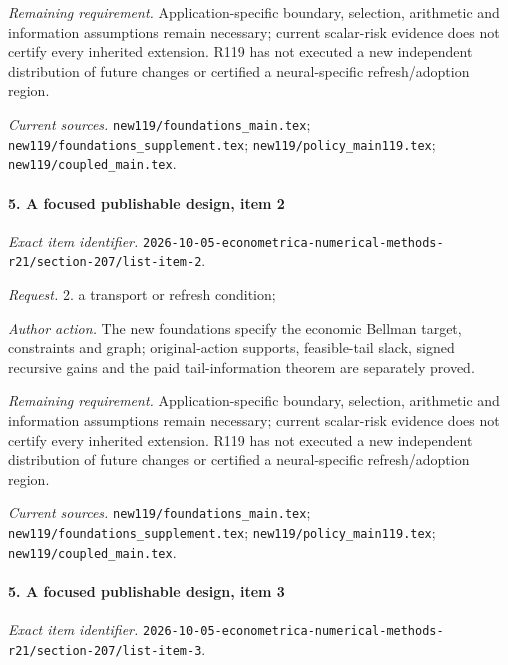 \par\emph{Remaining requirement.} Application-specific boundary, selection, arithmetic and information assumptions remain necessary; current scalar-risk evidence does not certify every inherited extension. R119 has not executed a new independent distribution of future changes or certified a neural-specific refresh/\allowbreak{}adoption region.

\par\emph{Current sources.} \nolinkurl{new119/foundations_main.tex}; \nolinkurl{new119/foundations_supplement.tex}; \nolinkurl{new119/policy_main119.tex}; \nolinkurl{new119/coupled_main.tex}.

\paragraph{5. A focused publishable design, item 2}

\emph{Exact item identifier.} \nolinkurl{2026-10-05-econometrica-numerical-methods-r21/section-207/list-item-2}.

\par\emph{Request.} 2. a transport or refresh condition;

\par\emph{Author action.} The new foundations specify the economic Bellman target, constraints and graph; original-action supports, feasible-tail slack, signed recursive gains and the paid tail-information theorem are separately proved.

\par\emph{Remaining requirement.} Application-specific boundary, selection, arithmetic and information assumptions remain necessary; current scalar-risk evidence does not certify every inherited extension. R119 has not executed a new independent distribution of future changes or certified a neural-specific refresh/\allowbreak{}adoption region.

\par\emph{Current sources.} \nolinkurl{new119/foundations_main.tex}; \nolinkurl{new119/foundations_supplement.tex}; \nolinkurl{new119/policy_main119.tex}; \nolinkurl{new119/coupled_main.tex}.

\paragraph{5. A focused publishable design, item 3}

\emph{Exact item identifier.} \nolinkurl{2026-10-05-econometrica-numerical-methods-r21/section-207/list-item-3}.

